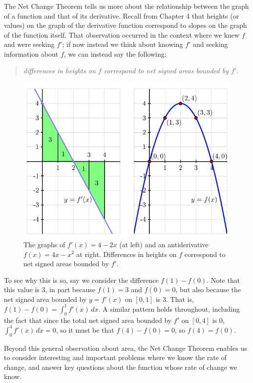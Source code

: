 The Net Change Theorem tells us more about the relationship between the graph of a function and that of its derivative.  Recall from Chapter 4 that heights (or values) on the graph of the derivative function correspond to slopes on the graph of the function itself.  That observation occurred in the context where we knew $f$ and were seeking $f'$; if now instead we think about knowing $f'$ and seeking information about $f$, we can instead say the following:  
\begin{quote}
\emph{differences in heights on $f$ correspond to net signed areas bounded by $f'$.}
\end{quote}
\begin{figure}[h]
\begin{center}
\includegraphics{figures/4_4_TCT}
\caption{The graphs of $f'(x) = 4 - 2x$ (at left) and an antiderivative $f(x) = 4x - x^2$ at right.  Differences in heights on $f$ correspond to net signed areas bounded by $f'$.} \label{F:4.4.TCT}
\end{center}
\end{figure}
To see why this is so, say we consider the difference $f(1) - f(0)$.  Note that this value is $ 3 $, in part because $f(1) = 3$ and $f(0) = 0$, but also because the net signed area bounded by $y = f'(x)$ on $[0,1]$ is 3.  That is, $f(1) - f(0) = \int_0^1 f'(x) \, dx$.  A similar pattern holds throughout, including the fact that since the total net signed area bounded by $f'$ on $[0,4]$ is $0$, $\int_0^4 f'(x) \, dx = 0$, so it must be that $f(4) - f(0) = 0$, so $f(4) = f(0)$.

Beyond this general observation about area, the Net Change Theorem enables us to consider interesting and important problems where we know the rate of change, and answer key questions about the function whose rate of change we know. 

